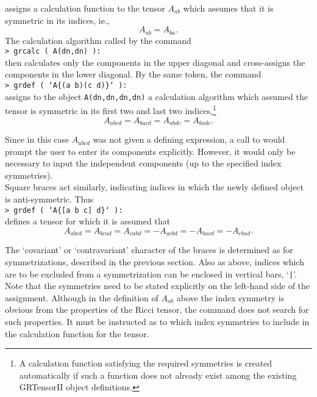 \documentclass{article}
\begin{document}
\noindent assigns a calculation function to the tensor
$A_{ab}$ which assumes that it is symmetric in its indices, ie.,
\[
  A_{ab} = A_{ba}.
\]
The calculation algorithm called by the command \\

\noindent\texttt{> grcalc ( A(dn,dn) ):}\\

\noindent then calculates only the components in the upper diagonal
and cross-assigns the components in the lower diagonal. By the same
token, the command\\

\noindent\texttt{> grdef ( `A\{(a b)(c d)\}` ):}\\

\noindent assigns to the object \texttt{A(dn,dn,dn,dn)} a calculation
algorithm which assumed the tensor is symmetric in its first two and
last two indices,\footnote{A calculation function satisfying the
required symmetries is created automatically if such a function does
not already exist among the existing GRTensorII object definitions.}
\[
  A_{abcd} = A_{bacd} = A_{abdc} = A_{badc}.
\]

\indent Since in this case $A_{abcd}$ was not given a defining
expression, a call to  would prompt the user to enter
its components explicitly. However, it would only be necessary to
input the independent components (up to the specified index
symmetries).\\

Square braces act similarly, indicating indices in which the newly
defined object is anti-symmetric. Thus\\

\noindent\texttt{> grdef ( `A\{[a b c] d\}` ): }\\

\noindent defines a tensor for which it is assumed that
\[
  A_{abcd} = A_{bcad} = A_{cabd} = -A_{acbd} = -A_{bacd} = -A_{cbad}.
\]

The `covariant' or `contravariant' character of the braces is
determined as for symmetrizations, described in the previous
section. Also as above, indices which are to be excluded from a
symmetrization can be enclosed in vertical bars, `\texttt{|}'.\\

Note that the symmetries need to be stated explicitly on the left-hand
side of the assignment. Although in the definition of $A_{ab}$ above
the index symmetry is obvious from the properties of the Ricci tensor,
the  command does not search for such properties. It must
be instructed as to which index symmetries to include in the
calculation function for the tensor.
\end{document}

